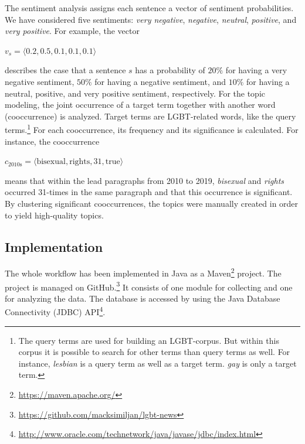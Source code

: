 \documentclass[10pt,a4paper,twocolumn]{scrartcl}
\begin{document}
The sentiment analysis assigns each sentence a vector of sentiment probabilities. We have considered five sentiments: \textit{very negative}, \textit{negative}, \textit{neutral}, \textit{positive}, and \textit{very positive}. For example, the vector \begin{center}
$v_s = \langle 0.2, 0.5, 0.1, 0.1, 0.1\rangle$
\end{center} describes the case that a sentence $s$ has a probability of $20\%$ for having a very negative sentiment, $50\%$ for having a negative sentiment, and $10\%$ for having a neutral, positive, and very positive sentiment, respectively. For the topic modeling, the joint occurrence of a target term together with another word (cooccurrence) is analyzed. Target terms are LGBT-related words, like the query terms.\footnote{The query terms are used for building an LGBT-corpus. But within this corpus it is possible to search for other terms than query terms as well. For instance, \textit{lesbian} is a query term as well as a target term. \textit{gay} is only a target term.} For each cooccurrence, its frequency and its significance is calculated. For instance, the cooccurrence \begin{center}
$c_\text{2010s} = \langle \text{bisexual}, \text{rights}, 31, \text{true}\rangle$
\end{center} means that within the lead paragraphs from 2010 to 2019, \textit{bisexual} and \textit{rights} occurred 31-times in the same paragraph and that this occurrence is significant. By clustering significant cooccurrences, the topics were manually created in order to yield high-quality topics.

\subsection*{Implementation} The whole workflow has been implemented in Java as a Maven\footnote{\url{https://maven.apache.org/}} project. The project is managed on GitHub.\footnote{\url{https://github.com/macksimiljan/lgbt-news}} It consists of one module for collecting and one for analyzing the data. The database is accessed by using the Java Database Connectivity (JDBC) API\footnote{\url{http://www.oracle.com/technetwork/java/javase/jdbc/index.html}}.
\end{document}
